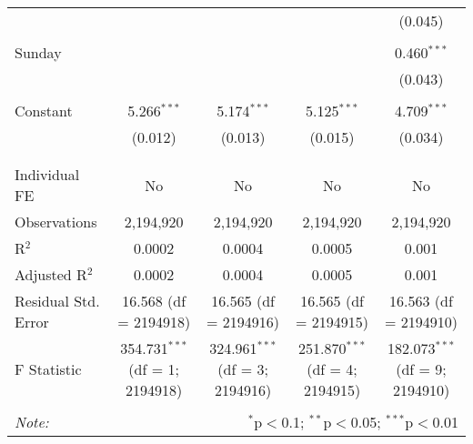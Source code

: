 \documentclass[
]{article}
\begin{document}
\begin{table}[!htbp]
{\begin{tabular}{@{\extracolsep{5pt}}lcccc}
  &  &  &  & (0.045) \\ 
  & & & & \\ 
 Sunday &  &  &  & 0.460$^{***}$ \\ 
  &  &  &  & (0.043) \\ 
  & & & & \\ 
 Constant & 5.266$^{***}$ & 5.174$^{***}$ & 5.125$^{***}$ & 4.709$^{***}$ \\ 
  & (0.012) & (0.013) & (0.015) & (0.034) \\ 
  & & & & \\ 
\hline \\[-1.8ex] 
Individual FE & No & No & No & No \\ 
Observations & 2,194,920 & 2,194,920 & 2,194,920 & 2,194,920 \\ 
R$^{2}$ & 0.0002 & 0.0004 & 0.0005 & 0.001 \\ 
Adjusted R$^{2}$ & 0.0002 & 0.0004 & 0.0005 & 0.001 \\ 
Residual Std. Error & 16.568 (df = 2194918) & 16.565 (df = 2194916) & 16.565 (df = 2194915) & 16.563 (df = 2194910) \\ 
F Statistic & 354.731$^{***}$ (df = 1; 2194918) & 324.961$^{***}$ (df = 3; 2194916) & 251.870$^{***}$ (df = 4; 2194915) & 182.073$^{***}$ (df = 9; 2194910) \\ 
\hline 
\hline \\[-1.8ex] 
\textit{Note:}  & \multicolumn{4}{r}{$^{*}$p$<$0.1; $^{**}$p$<$0.05; $^{***}$p$<$0.01} \\ 
\end{tabular}
} 
\end{table} 
\newpage
\end{document}
